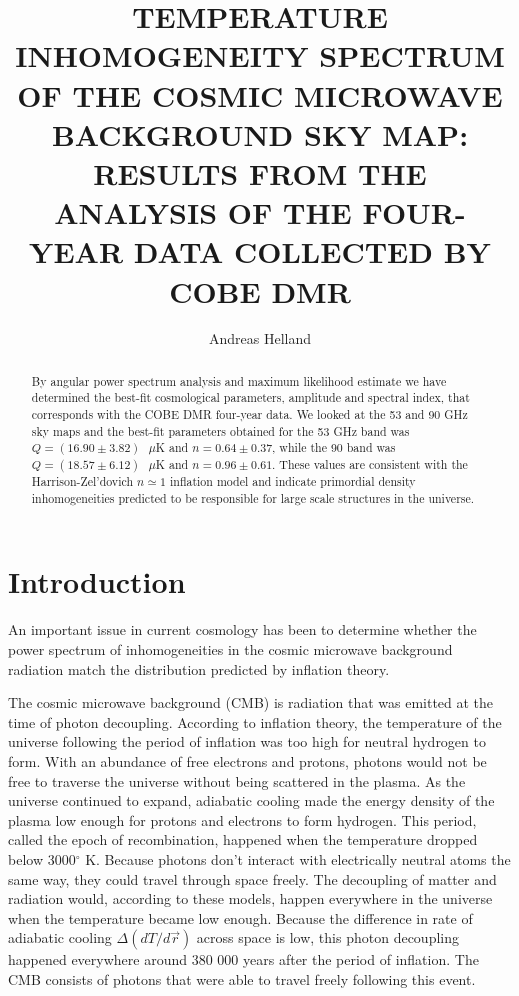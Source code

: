 \documentclass{emulateapj}
\begin{document}
	
	\title{TEMPERATURE INHOMOGENEITY SPECTRUM OF THE COSMIC MICROWAVE BACKGROUND SKY MAP: RESULTS FROM THE ANALYSIS OF THE FOUR-YEAR DATA COLLECTED BY COBE DMR} 

	
	\author{Andreas Helland}
	
	
	
	


\begin{abstract}
By angular power spectrum analysis and maximum likelihood estimate we have determined the best-fit cosmological parameters, amplitude and spectral index, that corresponds with the COBE DMR four-year data. We looked at the 53 and 90 GHz sky maps and the best-fit parameters obtained for the 53 GHz band was  $Q = (16.90 \pm 3.82) \text{ }\mu$K and $n = 0.64 \pm  0.37$, while the 90 band was $Q = (18.57 \pm 6.12) \text{ }\mu$K and $n = 0.96 \pm 0.61$. These values are consistent with the Harrison-Zel'dovich $n \simeq 1$ inflation model and indicate primordial density inhomogeneities predicted to be responsible for large scale structures in the universe.
\end{abstract}




\section{Introduction}
\label{sec:introduction}

An important issue in current cosmology has been to determine whether the power spectrum of inhomogeneities in the cosmic microwave background radiation match the distribution predicted by inflation theory. 

The cosmic microwave background (CMB) is radiation that was emitted at the time of photon decoupling. According to inflation theory, the temperature of the universe following the period of inflation was too high for neutral hydrogen to form. With an abundance of free electrons and protons, photons would not be free to traverse the universe without being scattered in the plasma. As the universe continued to expand, adiabatic cooling made the energy density of the plasma low enough for protons and electrons to form hydrogen. This period, called the epoch of recombination, happened when the temperature dropped below 3000$^\circ$ K. Because photons don't interact with electrically neutral atoms the same way, they could travel through space freely. The decoupling of matter and radiation would, according to these models, happen everywhere in the universe when the temperature became low enough. Because the difference in rate of adiabatic cooling $\Delta(dT/d\vec{r})$ across space is low, this photon decoupling happened everywhere around 380 000 years after the period of inflation. The CMB consists of photons that were able to travel freely following this event. 
\end{document}
